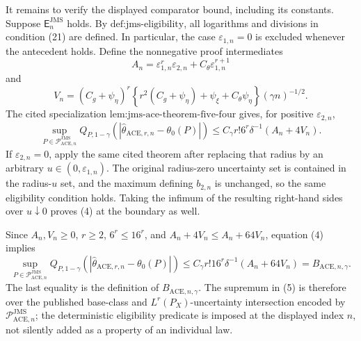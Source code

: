 It remains to verify the displayed comparator bound, including its
constants.  Suppose \(\mathsf E_n^{\mathrm{JMS}}\) holds.  By
\(\text{def:jms-eligibility}\), all logarithms and divisions in
condition (21) are defined.  In particular, the case
\(\varepsilon_{1,n}=0\) is excluded whenever the antecedent holds.
Define the nonnegative proof intermediates
\[
 A_n=\varepsilon_{1,n}^{r}\varepsilon_{2,n}
       +C_\theta\varepsilon_{1,n}^{r+1}
\]
and
\[
 V_n=(C_g+\psi_\eta)^r
 \left\{r^2(C_g+\psi_\eta)+\psi_\xi+C_\theta\psi_\eta\right\}
 (\gamma n)^{-1/2}.
\]
The cited specialization \(\text{lem:jms-ace-theorem-five-four}\)
gives, for positive \(\varepsilon_{2,n}\),
\[
 \sup_{P\in\mathcal P_{\mathrm{ACE},n}^{\mathrm{JMS}}}
 Q_{P,1-\gamma}
 \!\left(|\widehat\theta_{\mathrm{ACE},r,n}-\theta_0(P)|\right)
 \le C_\gamma r!6^r\delta^{-1}(A_n+4V_n).                \tag{4}
\]
If \(\varepsilon_{2,n}=0\), apply the same cited theorem after replacing
that radius by an arbitrary \(u\in(0,\varepsilon_{1,n})\).  The original
radius-zero uncertainty set is contained in the radius-\(u\) set, and
the maximum defining \(b_{2,n}\) is unchanged, so the same eligibility
condition holds.  Taking the infimum of the resulting right-hand sides
over \(u\downarrow0\) proves (4) at the boundary as well.

Since \(A_n,V_n\ge0\), \(r\ge2\), \(6^r\le16^r\), and
\(A_n+4V_n\le A_n+64V_n\), equation (4) implies
\[
 \sup_{P\in\mathcal P_{\mathrm{ACE},n}^{\mathrm{JMS}}}
 Q_{P,1-\gamma}
 \!\left(|\widehat\theta_{\mathrm{ACE},r,n}-\theta_0(P)|\right)
 \le C_\gamma r!16^r\delta^{-1}(A_n+64V_n)
 =B_{\mathrm{ACE},n,\gamma}.                              \tag{5}
\]
The last equality is the definition of \(B_{\mathrm{ACE},n,\gamma}\).
The supremum in (5) is therefore over the published base-class and
\(L^r(P_X)\)-uncertainty intersection encoded by
\(\mathcal P_{\mathrm{ACE},n}^{\mathrm{JMS}}\); the deterministic
eligibility predicate is imposed at the displayed index \(n\), not
silently added as a property of an individual law.